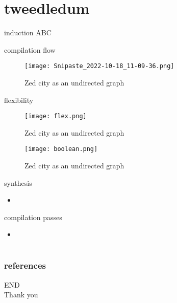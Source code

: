 \documentclass[aspectratio=1610]{beamer}
\begin{document}
\section{tweedledum}
\begin{frame}{induction}  
  ABC 
\end{frame}
\begin{frame}{compilation flow}
  \begin{figure}[htbq]
    \centering
    \texttt{[image: Snipaste\_2022-10-18\_11-09-36.png]}
    \caption{Zed city as an undirected graph} 
    \label{dataset}
  \end{figure}
\end{frame}
\begin{frame}{flexibility}
  \begin{figure}[htbq]
    \centering
    \texttt{[image: flex.png]}
    \caption{Zed city as an undirected graph} 
    \label{dataset}
  \end{figure}
\end{frame}
\begin{frame}
  \begin{figure}[htbq]
    \centering
    \texttt{[image: boolean.png]}
    \caption{Zed city as an undirected graph} 
    \label{dataset}
  \end{figure}
\end{frame}
\begin{frame}{synthesis}
  \begin{itemize}
    \item 
  \end{itemize}  
\end{frame}
\begin{frame}{compilation passes}
  \begin{itemize}
    \item 
  \end{itemize}
\end{frame}
\section*{}
\begin{frame}
	\frametitle{references}
	\printbibliography
\end{frame}
\begin{frame}
\centering
\Huge{END\\Thank you}
\end{frame}
\end{document}
